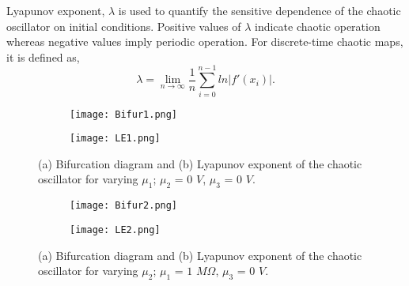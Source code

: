 \documentclass[conference]{IEEEtran}
\begin{document}
Lyapunov exponent, $\lambda$ is used to quantify the sensitive dependence of the chaotic oscillator on initial conditions. Positive values of $\lambda$ indicate chaotic operation whereas negative values imply periodic operation. For discrete-time chaotic maps, it is defined as,
 \begin{equation}
    \lambda=\lim_{n \to \infty} \frac{1}{n}\sum_{i=0}^{n-1}ln|f'(x_i)| .
    \label{eq:overhead1}
\end{equation}

  



\begin{figure}
    \centering
     \begin{subfigure}[b]{0.4\textwidth}
       \texttt{[image: Bifur1.png]}
        \caption{}
        \label{fig:bif_1}
    \end{subfigure}
    \begin{subfigure}[b]{0.4\textwidth}
      \texttt{[image: LE1.png]}
        \caption{}
        \label{fig:LE_1}
    \end{subfigure}
    
    \caption{\small{(a) Bifurcation diagram and (b) Lyapunov exponent of the chaotic oscillator for varying $\mu_1$; $\mu_2$ = $0$ $V$,  $\mu_3$ = $0$ $V$.} }
 \label{bif_mu1}
\end{figure}

\begin{figure}
    \centering
     \begin{subfigure}[b]{0.4\textwidth}
       \texttt{[image: Bifur2.png]}
        \caption{}
        \label{fig:bif_2}
    \end{subfigure}
    \begin{subfigure}[b]{0.4\textwidth}
      \texttt{[image: LE2.png]}
        \caption{}
        \label{fig:LE_2}
    \end{subfigure}
    
    \caption{\small{(a) Bifurcation diagram and (b) Lyapunov exponent of the chaotic oscillator for varying $\mu_2$; $\mu_1$ = $1$ $M\Omega$,  $\mu_3$ = $0$ $V$.} }
 \label{bif_mu2}
\end{figure}
\end{document}
